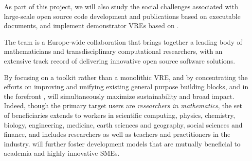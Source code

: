 As part of this project, we will also study the social challenges
associated with large-scale open source code development and publications based on executable documents, and implement
demonstrator VREs based on \TheProject.

The \TheProject team is a Europe-wide collaboration that brings
together a leading body of mathematicians and transdisciplinary
computational researchers, with an extensive track record of
delivering innovative open source software solutions.

By focusing on a toolkit rather than a monolithic VRE, and by
concentrating the efforts on improving and unifying existing general
purpose building blocks, and in the forefront \Jupyter, \TheProject
will simultaneously maximize sustainability and broad impact. Indeed,
though the primary target users are \emph{researchers in
  mathematics}, the set of beneficiaries extends to workers in scientific
computing, physics, chemistry, biology, engineering, medicine, earth
sciences and geography, social sciences and finance, and includes researchers as well as teachers
and practitioners in the industry. \TheProject will further foster
development models that are mutually beneficial to academia and highly
innovative SMEs.






\clearpage


